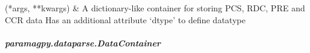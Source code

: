 \documentclass[a4paper,10pt,english]{sphinxmanual}
\begin{document}
\begin{savenotes}\sphinxatlongtablestart\begin{longtable}{}
\hline

\endfirsthead

%
{}\\
\hline

\endhead

\hline
{}\\
\endfoot

\endlastfoot

{\hyperref[\detokenize{reference/generated/paramagpy.dataparse.DataContainer:paramagpy.dataparse.DataContainer}]{}}(*args, **kwargs)
&
A dictionary-like container for storing PCS, RDC, PRE and CCR data Has an additional attribute ‘dtype’ to define datatype
\\
\hline
\end{longtable}\sphinxatlongtableend\end{savenotes}


\subparagraph{paramagpy.dataparse.DataContainer}
\label{\detokenize{reference/generated/paramagpy.dataparse.DataContainer:paramagpy-dataparse-datacontainer}}\label{\detokenize{reference/generated/paramagpy.dataparse.DataContainer::doc}}
\end{document}
